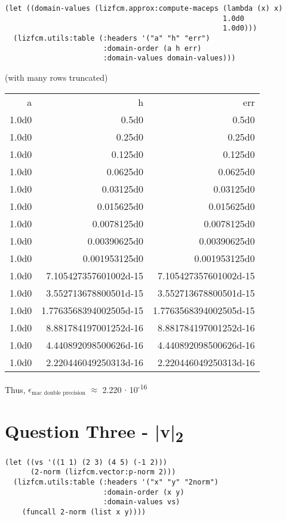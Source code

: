\documentclass[11pt]{article}
\begin{document}
\begin{verbatim}
(let ((domain-values (lizfcm.approx:compute-maceps (lambda (x) x)
                                                   1.0d0
                                                   1.0d0)))
  (lizfcm.utils:table (:headers '("a" "h" "err")
                       :domain-order (a h err)
                       :domain-values domain-values)))
\end{verbatim}

(with many rows truncated)
\begin{center}
\begin{tabular}{rrr}
a & h & err\\[0pt]
1.0d0 & 0.5d0 & 0.5d0\\[0pt]
1.0d0 & 0.25d0 & 0.25d0\\[0pt]
1.0d0 & 0.125d0 & 0.125d0\\[0pt]
1.0d0 & 0.0625d0 & 0.0625d0\\[0pt]
1.0d0 & 0.03125d0 & 0.03125d0\\[0pt]
1.0d0 & 0.015625d0 & 0.015625d0\\[0pt]
1.0d0 & 0.0078125d0 & 0.0078125d0\\[0pt]
1.0d0 & 0.00390625d0 & 0.00390625d0\\[0pt]
1.0d0 & 0.001953125d0 & 0.001953125d0\\[0pt]
1.0d0 & 7.105427357601002d-15 & 7.105427357601002d-15\\[0pt]
1.0d0 & 3.552713678800501d-15 & 3.552713678800501d-15\\[0pt]
1.0d0 & 1.7763568394002505d-15 & 1.7763568394002505d-15\\[0pt]
1.0d0 & 8.881784197001252d-16 & 8.881784197001252d-16\\[0pt]
1.0d0 & 4.440892098500626d-16 & 4.440892098500626d-16\\[0pt]
1.0d0 & 2.220446049250313d-16 & 2.220446049250313d-16\\[0pt]
\end{tabular}
\end{center}

Thus, \(\epsilon_{\text{mac double precision}}\) \(\approx\) 2.220 \(\cdot\) 10\textsuperscript{-16}

\section{Question Three - |v|\textsubscript{2}}
\label{sec:orgf181ba7}
\begin{verbatim}
(let ((vs '((1 1) (2 3) (4 5) (-1 2)))
      (2-norm (lizfcm.vector:p-norm 2)))
  (lizfcm.utils:table (:headers '("x" "y" "2norm")
                       :domain-order (x y)
                       :domain-values vs)
    (funcall 2-norm (list x y))))
\end{verbatim}
\end{document}
